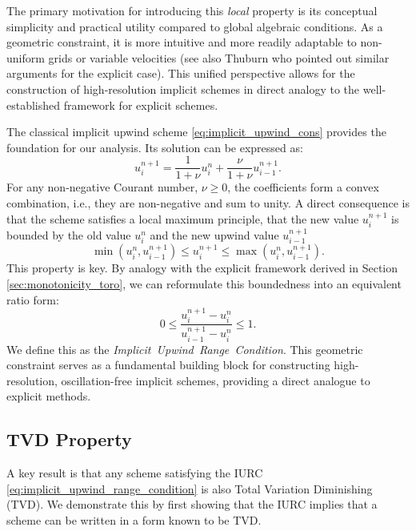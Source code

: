 The primary motivation for introducing this \textit{local} property is its conceptual simplicity and practical utility compared to global algebraic conditions.
As a geometric constraint, it is more intuitive and more readily adaptable to non-uniform grids or variable velocities 
(see also Thuburn \cite{thuburn1997tvd} who pointed out similar arguments for the explicit case).
This unified perspective allows for the construction of high-resolution implicit schemes in direct analogy to the well-established framework for explicit schemes.

The classical implicit upwind scheme \eqref{eq:implicit_upwind_cons} provides the foundation for our analysis.
Its solution can be expressed as:
\begin{equation}
    \label{eq:implicit_upwind_solution_iurc}
    u_{i}^{n+1} = \frac{1}{1+\nu}u_{i}^{n} + \frac{\nu}{1+\nu}u_{i-1}^{n+1}.
\end{equation}
For any non-negative Courant number, \(\nu \geq 0\), the coefficients form a convex combination, i.e., they are non-negative and sum to unity.
A direct consequence is that the scheme satisfies a local maximum principle, that the new value \(u_{i}^{n+1}\) is bounded by the old value \(u_{i}^{n}\) and the new upwind value \(u_{i-1}^{n+1}\)
\[
    \min(u_{i}^{n},u_{i-1}^{n+1}) \leq u_{i}^{n+1} \leq \max(u_{i}^{n},u_{i-1}^{n+1}).
\]
This property is key.
By analogy with the explicit framework derived in Section \ref{sec:monotonicity_toro}, we can reformulate this boundedness into an equivalent ratio form:
\begin{equation}
    \label{eq:implicit_upwind_range_condition}
    0 \leq \frac{u_{i}^{n+1}-u_{i}^{n}}{u_{i-1}^{n+1}-u_{i}^{n}} \leq 1.
\end{equation}
We define this as the \textit{Implicit~Upwind~Range~Condition}.
This geometric constraint serves as a fundamental building block for constructing high-resolution, oscillation-free implicit schemes, providing a direct analogue to explicit methods.

\subsection{TVD Property}%
\label{sub:implicit_tvd}

A key result is that any scheme satisfying the IURC \eqref{eq:implicit_upwind_range_condition} is also Total Variation Diminishing (TVD).
We demonstrate this by first showing that the IURC implies that a scheme can be written in a form known to be TVD.

